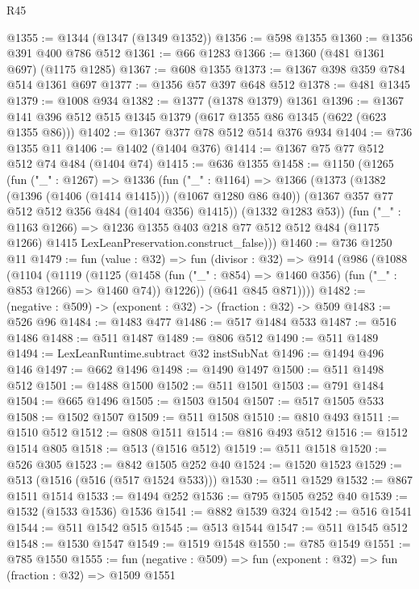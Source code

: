 \begin{lexlean}{R45}
\begin{coremodule}
@1355 := @1344 (@1347 (@1349 @1352))
@1356 := @598 @1355
@1360 := @1356 @391 @400 @786 @512
@1361 := @66 @1283
@1366 := @1360 (@481 @1361 @697) (@1175 @1285)
@1367 := @608 @1355
@1373 := @1367 @398 @359 @784 @514 @1361 @697
@1377 := @1356 @57 @397 @648 @512
@1378 := @481 @1345
@1379 := @1008 @934
@1382 := @1377 (@1378 @1379) @1361
@1396 := @1367 @141 @396 @512 @515 @1345 @1379 (@617 @1355 @86 @1345 (@622 (@623 @1355 @86)))
@1402 := @1367 @377 @78 @512 @514 @376 @934
@1404 := @736 @1355 @11
@1406 := @1402 (@1404 @376)
@1414 := @1367 @75 @77 @512 @512 @74 @484 (@1404 @74)
@1415 := @636 @1355
@1458 := @1150
    (@1265
      (fun ("_" : @1267) =>
      @1336
        (fun ("_" : @1164) =>
        @1366
          (@1373
            (@1382 (@1396 (@1406 (@1414 @1415))) (@1067 @1280 @86 @40))
            (@1367 @357 @77 @512 @512 @356 @484 (@1404 @356) @1415))
          (@1332 @1283 @53))
        (fun ("_" : @1163 @1266) =>
        @1236
          @1355
          @403
          @218
          @77
          @512
          @512
          @484
          (@1175 @1266)
          @1415
          LexLeanPreservation.construct_false)))
@1460 := @736 @1250 @11
@1479 := fun (value : @32) =>
  fun (divisor : @32) =>
  @914
    (@986
      (@1088
        (@1104
          (@1119
            (@1125
              (@1458 (fun ("_" : @854) => @1460 @356) (fun ("_" : @853 @1266) => @1460 @74))
              @1226))
          (@641 @845 @871))))
@1482 := (negative : @509) -> (exponent : @32) -> (fraction : @32) -> @509
@1483 := @526 @96
@1484 := @1483 @477
@1486 := @517 @1484 @533
@1487 := @516 @1486
@1488 := @511 @1487
@1489 := @806 @512
@1490 := @511 @1489
@1494 := LexLeanRuntime.subtract @32 instSubNat
@1496 := @1494 @496 @146
@1497 := @662 @1496
@1498 := @1490 @1497
@1500 := @511 @1498 @512
@1501 := @1488 @1500
@1502 := @511 @1501
@1503 := @791 @1484
@1504 := @665 @1496
@1505 := @1503 @1504
@1507 := @517 @1505 @533
@1508 := @1502 @1507
@1509 := @511 @1508
@1510 := @810 @493
@1511 := @1510 @512
@1512 := @808 @1511
@1514 := @816 @493 @512
@1516 := @1512 @1514 @805
@1518 := @513 (@1516 @512)
@1519 := @511 @1518
@1520 := @526 @305
@1523 := @842 @1505 @252 @40
@1524 := @1520 @1523
@1529 := @513 (@1516 (@516 (@517 @1524 @533)))
@1530 := @511 @1529
@1532 := @867 @1511 @1514
@1533 := @1494 @252
@1536 := @795 @1505 @252 @40
@1539 := @1532 (@1533 @1536) @1536
@1541 := @882 @1539 @324
@1542 := @516 @1541
@1544 := @511 @1542 @515
@1545 := @513 @1544
@1547 := @511 @1545 @512
@1548 := @1530 @1547
@1549 := @1519 @1548
@1550 := @785 @1549
@1551 := @785 @1550
@1555 := fun (negative : @509) => fun (exponent : @32) => fun (fraction : @32) => @1509 @1551

\end{coremodule}
\end{lexlean}
